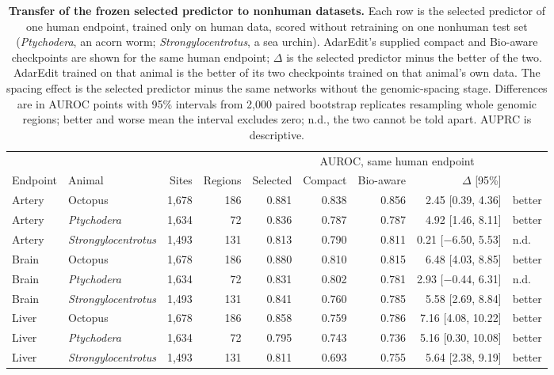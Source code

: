 \begin{table}[H]
\centering
\footnotesize
\setlength{\tabcolsep}{4.5pt}
\caption{\textbf{Transfer of the frozen selected predictor to nonhuman datasets.} Each row is the selected predictor of one human endpoint, trained only on human data, scored without retraining on one nonhuman test set (\textit{Ptychodera}, an acorn worm; \textit{Strongylocentrotus}, a sea urchin). AdarEdit's supplied compact and Bio-aware checkpoints are shown for the same human endpoint; $\Delta$ is the selected predictor minus the better of the two. AdarEdit trained on that animal is the better of its two checkpoints trained on that animal's own data. The spacing effect is the selected predictor minus the same networks without the genomic-spacing stage. Differences are in AUROC points with 95\% intervals from 2,000 paired bootstrap replicates resampling whole genomic regions; better and worse mean the interval excludes zero; n.d., the two cannot be told apart. AUPRC is descriptive.}\label{tab:nonhuman}
\begin{tabular}{llrrrrrrl}
\toprule
 & & & & \multicolumn{5}{c}{AUROC, same human endpoint} \\
\cmidrule(lr){5-9}
Endpoint & Animal & Sites & Regions & Selected & Compact & Bio-aware & $\Delta$ [95\%] & \\
\midrule
Artery & Octopus & 1,678 & 186 & 0.881 & 0.838 & 0.856 & 2.45 [0.39, 4.36] & better \\
Artery & \textit{Ptychodera} & 1,634 & 72 & 0.836 & 0.787 & 0.787 & 4.92 [1.46, 8.11] & better \\
Artery & \textit{Strongylocentrotus} & 1,493 & 131 & 0.813 & 0.790 & 0.811 & 0.21 [$-$6.50, 5.53] & n.d. \\
Brain & Octopus & 1,678 & 186 & 0.880 & 0.810 & 0.815 & 6.48 [4.03, 8.85] & better \\
Brain & \textit{Ptychodera} & 1,634 & 72 & 0.831 & 0.802 & 0.781 & 2.93 [$-$0.44, 6.31] & n.d. \\
Brain & \textit{Strongylocentrotus} & 1,493 & 131 & 0.841 & 0.760 & 0.785 & 5.58 [2.69, 8.84] & better \\
Liver & Octopus & 1,678 & 186 & 0.858 & 0.759 & 0.786 & 7.16 [4.08, 10.22] & better \\
Liver & \textit{Ptychodera} & 1,634 & 72 & 0.795 & 0.743 & 0.736 & 5.16 [0.30, 10.08] & better \\
Liver & \textit{Strongylocentrotus} & 1,493 & 131 & 0.811 & 0.693 & 0.755 & 5.64 [2.38, 9.19] & better \\

\end{tabular}
\end{table}

